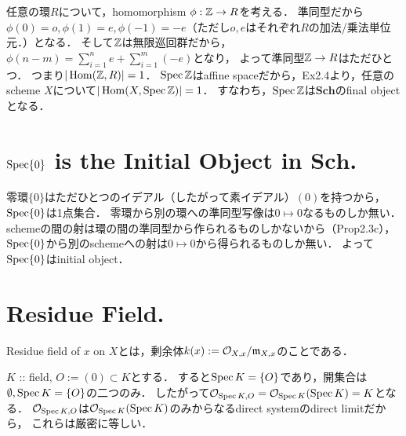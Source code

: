 \documentclass[a4paper]{jsarticle}
\newcommand{\shO}{\mathcal{O}}
\newcommand{\Sch}{\mathbf{Sch}}
\begin{document}
    任意の環$R$について，homomorphism $\phi: \mathbb{Z} \to R$を考える．
    準同型だから$\phi(0)=o, \phi(1)=e, \phi(-1)=-e$（ただし$o, e$はそれぞれ$R$の加法/乗法単位元．）となる．
    そして$\mathbb{Z}$は無限巡回群だから，$\phi(n-m)=\sum_{i=1}^n e+\sum_{i=1}^{m} (-e)$となり，
    よって準同型$\mathbb{Z} \to R$はただひとつ．
    つまり$|\operatorname{Hom}(\mathbb{Z}, R)|=1$．
    $\operatorname{Spec} \mathbb{Z}$はaffine spaceだから，Ex2.4より，任意のscheme $X$について$|\operatorname{Hom}(X, \operatorname{Spec} \mathbb{Z})|=1$．
    すなわち，$\operatorname{Spec} \mathbb{Z}$は$\Sch$のfinal objectとなる．

\section{$\operatorname{Spec} \{0\}$ is the Initial Object in $\Sch$.} %
    零環$\{0\}$はただひとつのイデアル（したがって素イデアル）$(0)$を持つから，$\operatorname{Spec} \{0\}$は1点集合．
    零環から別の環への準同型写像は$0 \mapsto 0$なるものしか無い．
    schemeの間の射は環の間の準同型から作られるものしかないから（Prop2.3c），
    $\operatorname{Spec} \{0\}$から別のschemeへの射は$0 \mapsto 0$から得られるものしか無い．
    よって$\operatorname{Spec} \{0\}$はinitial object．

\section{Residue Field.} %
    Residue field of $x$ on $X$とは，剰余体$k(x):=\shO_{X,x}/\I{m}_{X,x}$のことである．

    $K$ :: field, $O:=(0) \subset K$とする．
    すると$\operatorname{Spec} K=\{O\}$であり，開集合は$\emptyset, \operatorname{Spec} K=\{O\}$の二つのみ．
    したがって$\shO_{\Spec K, O}=\shO_{\Spec K}(\Spec K)=K$となる．
    $\shO_{\Spec K, O}$は$\shO_{\Spec K}(\Spec K)$のみからなるdirect systemのdirect limitだから，
    これらは厳密に等しい．
    
\end{document}
